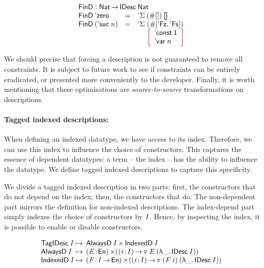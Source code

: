 \[\stk{
\FinD : \Nat \To \IDesc{\Nat} \\
\begin{array}{@{}llll}
\FinD\: \NatZero     & = & \multicolumn{2}{l}{\DSigma{(\EnumT{[]})}{\Void} } \\
\FinD\: (\NatSuc{\V{n}}) & = & \DSigma{\!}{\!}\!\!\!\!\! & (\EnumT{[ \FinZero , \FinSuc{\!} ]}) \\
                     &   &             & \bigRedBracket{
                                         \begin{array}{l}
                                         \DConst{\Unit} \\
                                         \DVar{\V{n}}
                                         \end{array}
                                         }
\end{array}
}\]

We should precise that forcing a description is not guaranteed to
remove all constraints. It is subject to future work to see if
constraints can be entirely eradicated, or presented more conveniently
to the developer.  Finally, it is worth mentioning that these
optimisations are \emph{source-to-source} transformations on
descriptions.

\paragraph{Tagged indexed descriptions:}

When defining an indexed datatype, we have access to its
index. Therefore, we can use this index to influence the choice of
constructors. This captures the essence of dependent datatypes: a
term -- the index -- has the ability to influence the datatype. We
define tagged indexed descriptions to capture this specificity.

We divide a tagged indexed description in two parts: first, the
constructors that do not depend on the index; then, the constructors
that do. The non-dependent part mirrors the definition for non-indexed
descriptions. The index-depend part simply indexes the choice of
constructors by $\V{I}$. Hence, by inspecting the index, it is
possible to enable or disable constructors.

\[
\begin{array}{@{}l@{\:\mapsto\:\:}l}
 \TagIDesc{\V{I}}  & \TIMES{\ATagIDesc{\V{I}}}{\ITagIDesc{\V{I}}} \\
 \ATagIDesc{\V{I}} & \SIGMA{\V{E}}{\EnumU} (\PI{\V{i}}{\V{I}} \spi{\V{E}}{(\LAM{\_} \IDesc{\V{I}})}) \\
 \ITagIDesc{\V{I}} & 
     \SIGMA{\V{F}}{\V{I} \To \EnumU} (\PI{\V{i}}{\V{I}} \spi{(\V{F}\: \V{i})}{(\LAM{\_} \IDesc{\V{I}})}) 
\end{array}
\]

